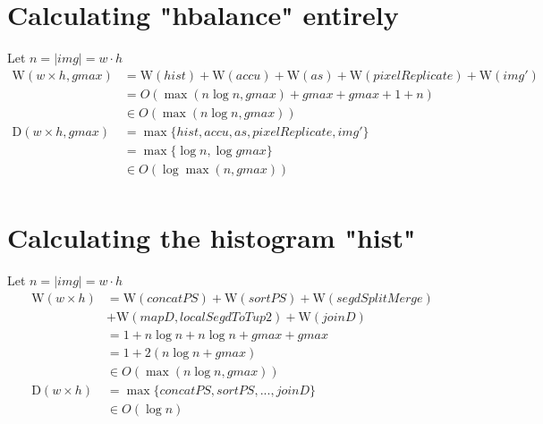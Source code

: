 \documentclass{article}
\newcommand{\W}[0]{\textrm{W}}
\newcommand{\D}[0]{\textrm{D}}
\begin{document}
    \section{Calculating "hbalance" entirely}
      Let $n = |img| = w\cdot h$
      \begin{equation}
      \begin{split}
      \W(w \times h,gmax)
            & = \W(hist) + \W(accu) + \W(as) + \W(pixelReplicate) + \W(img') \\
            & = O( \max(n \log n, gmax) + gmax + gmax + 1 + n) \\
            & \in O(\max(n \log n, gmax)) \\
      \D(w \times h,gmax)
          & = \max \{ hist, accu, as, pixelReplicate, img'\} \\
          & = \max \{\log n, \log gmax \} \\
          & \in O(\log \max(n,gmax)) \\
      \end{split}
      \end{equation}
        
    \section{Calculating the histogram "hist"}
      Let $n = |img| = w\cdot h$
      \begin{equation}
      \begin{split}
      \W(w \times h)
            & = \W(concatPS) + \W(sortPS) + \W(segdSplitMerge) \\
            & + \W(mapD,localSegdToTup2) + \W(joinD) \\
            & = 1 + n \log n + n \log n + gmax + gmax \\
            & = 1 + 2 (n \log n + gmax) \\
            & \in O(\max(n \log n, gmax)) \\
      \D(w \times h)
            & = \max \{ concatPS,sortPS,...,joinD\} \\
            & \in O(\log n) \\
      \end{split}
      \end{equation}
    
\end{document}

